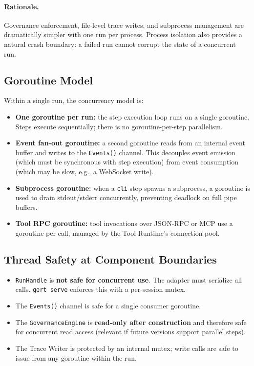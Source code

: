 \paragraph{Rationale.} Governance enforcement, file-level trace writes, and subprocess management
are dramatically simpler with one run per process. Process isolation also provides a natural
crash boundary: a failed run cannot corrupt the state of a concurrent run.

\subsection{Goroutine Model}

Within a single run, the concurrency model is:

\begin{itemize}
  \item \textbf{One goroutine per run:} the step execution loop runs on a single goroutine.
        Steps execute sequentially; there is no goroutine-per-step parallelism.
  \item \textbf{Event fan-out goroutine:} a second goroutine reads from an internal event
        buffer and writes to the \texttt{Events()} channel. This decouples event emission
        (which must be synchronous with step execution) from event consumption (which may
        be slow, e.g., a WebSocket write).
  \item \textbf{Subprocess goroutine:} when a \texttt{cli} step spawns a subprocess, a
        goroutine is used to drain stdout/stderr concurrently, preventing deadlock on
        full pipe buffers.
  \item \textbf{Tool RPC goroutine:} tool invocations over JSON-RPC or MCP use a goroutine
        per call, managed by the Tool Runtime's connection pool.
\end{itemize}

\subsection{Thread Safety at Component Boundaries}

\begin{itemize}
  \item \texttt{RunHandle} is \textbf{not safe for concurrent use}. The adapter must
        serialize all calls. \texttt{gert serve} enforces this with a per-session mutex.
  \item The \texttt{Events()} channel is safe for a single consumer goroutine.
  \item The \texttt{GovernanceEngine} is \textbf{read-only after construction} and therefore
        safe for concurrent read access (relevant if future versions support parallel steps).
  \item The Trace Writer is protected by an internal mutex; write calls are safe to issue
        from any goroutine within the run.
\end{itemize}

